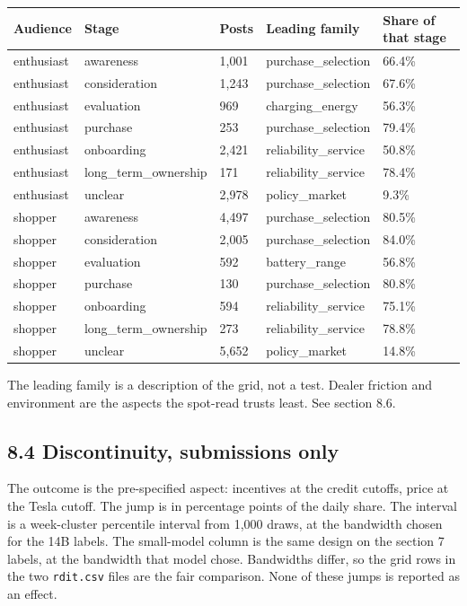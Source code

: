 \documentclass[11pt]{article}
\begin{document}
\begin{longtable}{lllll}
\toprule
Audience & Stage & Posts & Leading family & Share of that stage \\
\midrule
enthusiast & awareness & 1,001 & purchase\_selection & 66.4\% \\
enthusiast & consideration & 1,243 & purchase\_selection & 67.6\% \\
enthusiast & evaluation & 969 & charging\_energy & 56.3\% \\
enthusiast & purchase & 253 & purchase\_selection & 79.4\% \\
enthusiast & onboarding & 2,421 & reliability\_service & 50.8\% \\
enthusiast & long\_term\_ownership & 171 & reliability\_service & 78.4\% \\
enthusiast & unclear & 2,978 & policy\_market & 9.3\% \\
shopper & awareness & 4,497 & purchase\_selection & 80.5\% \\
shopper & consideration & 2,005 & purchase\_selection & 84.0\% \\
shopper & evaluation & 592 & battery\_range & 56.8\% \\
shopper & purchase & 130 & purchase\_selection & 80.8\% \\
shopper & onboarding & 594 & reliability\_service & 75.1\% \\
shopper & long\_term\_ownership & 273 & reliability\_service & 78.8\% \\
shopper & unclear & 5,652 & policy\_market & 14.8\% \\
\bottomrule
\end{longtable}


The leading family is a description of the grid, not a test. Dealer friction and environment are the aspects the spot-read trusts least. See section 8.6.


\subsection{8.4 Discontinuity, submissions only}

The outcome is the pre-specified aspect: incentives at the credit cutoffs, price at the Tesla cutoff. The jump is in percentage points of the daily share. The interval is a week-cluster percentile interval from 1,000 draws, at the bandwidth chosen for the 14B labels. The small-model column is the same design on the section 7 labels, at the bandwidth that model chose. Bandwidths differ, so the grid rows in the two \texttt{rdit.csv} files are the fair comparison. None of these jumps is reported as an effect.
\end{document}
